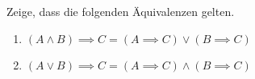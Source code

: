 \begin{exercise}
  Zeige, dass die folgenden Äquivalenzen gelten.
  \begin{enumerate}
  \item $(A \land B) \implies C = (A \implies C) \lor (B \implies C)$
  \item $(A \lor B) \implies C = (A \implies C) \land (B \implies C)$
  \end{enumerate}
\end{exercise}
